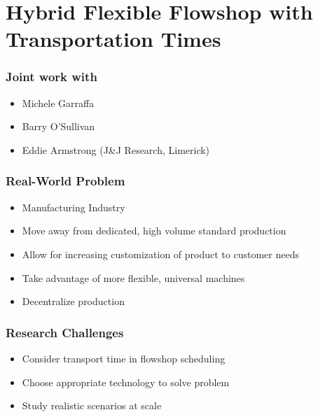 \section{Hybrid Flexible Flowshop with Transportation Times}


\begin{frame}
\frametitle{Joint work with}
\begin{itemize}
\item Michele Garraffa
\item Barry O'Sullivan
\item Eddie Armstrong (J\&J Research, Limerick)
\end{itemize}
\end{frame}


\begin{frame}
\frametitle{Real-World Problem}
\begin{itemize}
\item Manufacturing Industry
\item Move away from dedicated, high volume standard production
\item Allow for increasing customization of product to customer needs
\item Take advantage of more flexible, universal machines
\item Decentralize production
\end{itemize}
\end{frame}

\begin{frame}
\frametitle{Research Challenges}
\begin{itemize}
\item Consider transport time in flowshop scheduling
\item Choose appropriate technology to solve problem
\item Study realistic scenarios at scale
\end{itemize}
\end{frame}

